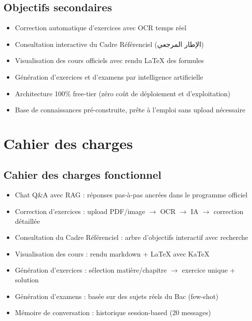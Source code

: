 \documentclass[12pt,a4paper]{report}
\begin{document}
\subsection{Objectifs secondaires}
\begin{itemize}
    \item Correction automatique d'exercices avec OCR temps réel
    \item Consultation interactive du Cadre Référenciel (الإطار المرجعي)
    \item Visualisation des cours officiels avec rendu LaTeX des formules
    \item Génération d'exercices et d'examens par intelligence artificielle
    \item Architecture 100\% free-tier (zéro coût de déploiement et d'exploitation)
    \item Base de connaissances pré-construite, prête à l'emploi sans upload nécessaire
\end{itemize}

\section{Cahier des charges}

\subsection{Cahier des charges fonctionnel}
\begin{itemize}
    \item Chat Q\&A avec RAG : réponses pas-à-pas ancrées dans le programme officiel
    \item Correction d'exercices : upload PDF/image $\rightarrow$ OCR $\rightarrow$ IA $\rightarrow$ correction détaillée
    \item Consultation du Cadre Référenciel : arbre d'objectifs interactif avec recherche
    \item Visualisation des cours : rendu markdown + LaTeX avec KaTeX
    \item Génération d'exercices : sélection matière/chapitre $\rightarrow$ exercice unique + solution
    \item Génération d'examens : basée sur des sujets réels du Bac (few-shot)
    \item Mémoire de conversation : historique session-based (20 messages)
\end{itemize}
\end{document}
